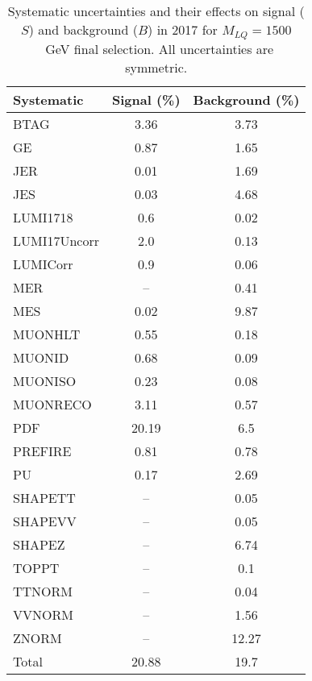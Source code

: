 \begin{table}[htbp]
\begin{center}
\caption{Systematic uncertainties and their effects on signal ($S$) and background ($B$) in 2017 for $M_{LQ}=1500$~GeV final selection. All uncertainties are symmetric.}
\begin{tabular}{lcc}
\hline\hline
Systematic & Signal (\%) & Background (\%) \\ \hline 
BTAG & 3.36 & 3.73\\ 
GE & 0.87 & 1.65\\ 
JER & 0.01 & 1.69\\ 
JES & 0.03 & 4.68\\ 
LUMI1718 & 0.6 & 0.02\\ 
LUMI17Uncorr & 2.0 & 0.13\\ 
LUMICorr & 0.9 & 0.06\\ 
MER & -- & 0.41\\ 
MES & 0.02 & 9.87\\ 
MUONHLT & 0.55 & 0.18\\ 
MUONID & 0.68 & 0.09\\ 
MUONISO & 0.23 & 0.08\\ 
MUONRECO & 3.11 & 0.57\\ 
PDF & 20.19 & 6.5\\ 
PREFIRE & 0.81 & 0.78\\ 
PU & 0.17 & 2.69\\ 
SHAPETT & -- & 0.05\\ 
SHAPEVV & -- & 0.05\\ 
SHAPEZ & -- & 6.74\\ 
TOPPT & -- & 0.1\\ 
TTNORM & -- & 0.04\\ 
VVNORM & -- & 1.56\\ 
ZNORM & -- & 12.27\\ 
Total & 20.88 & 19.7\\ \hline \hline
\end{tabular}
\label{tab:SysUncertainties_uujj_1500}
\end{center}
\end{table}

